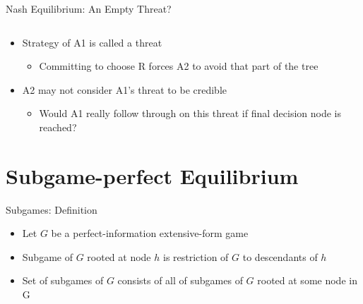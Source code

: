 \documentclass[11pt,aspectratio=169]{beamer}
\begin{document}
\begin{frame}{Nash Equilibrium: An Empty Threat?}
\begin{columns}
\begin{column}{0.4\textwidth}
    \end{column}
   \end{columns}
   \vspace{1cm}
   \begin{itemize}
    \item<3-> Strategy of A1 is called a \alert{threat}
    \begin{itemize}
     \item Committing to choose R forces A2 to avoid that part of the tree
    \end{itemize}
    \item<4-> A2 may not consider A1's threat to be \alert{credible}
    \begin{itemize}
     \item Would A1 really follow through on this threat if final decision node is reached?
    \end{itemize}
   \end{itemize}
  \end{frame}


 \section{Subgame-perfect Equilibrium}
 
  \begin{frame}{Subgames: Definition}
   \begin{itemize}
   \setlength{\itemsep}{1.5em}
    \item Let $G$ be a perfect-information extensive-form game
    \item \alert{Subgame} of $G$ rooted at node $h$ is restriction of $G$ to descendants of $h$
    \item Set of subgames of $G$ consists of all of subgames of $G$ rooted at some node in G
   \end{itemize}
  \end{frame}
\end{document}
